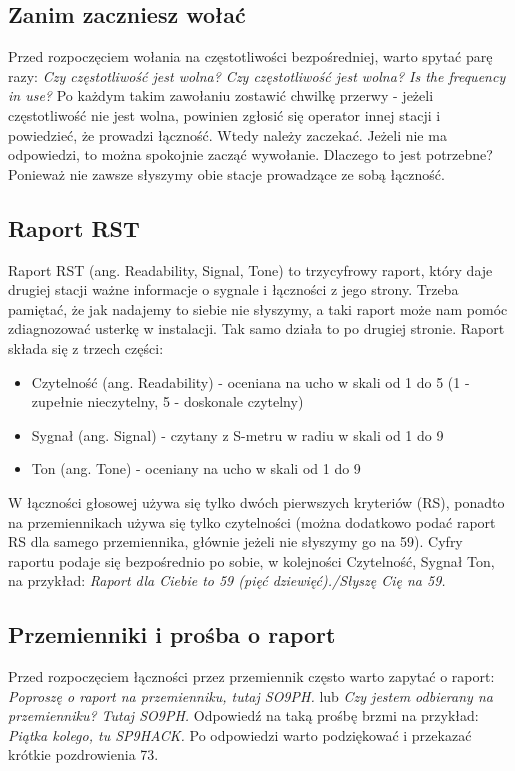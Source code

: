 \documentclass[a4paper,11pt]{article}
\begin{document}
\subsection{Zanim zaczniesz wołać}
Przed rozpoczęciem wołania na częstotliwości bezpośredniej, warto spytać parę razy: \textit{Czy częstotliwość jest wolna? Czy częstotliwość jest wolna? Is the frequency in use?} Po każdym takim zawołaniu zostawić chwilkę przerwy - jeżeli częstotliwość nie jest wolna, powinien zgłosić się operator innej stacji i powiedzieć, że prowadzi łączność. Wtedy należy zaczekać. Jeżeli nie ma odpowiedzi, to można spokojnie zacząć wywołanie. Dlaczego to jest potrzebne? Ponieważ nie zawsze słyszymy obie stacje prowadzące ze sobą łączność.
\subsection{Raport RST}
Raport RST (ang. Readability, Signal, Tone) to trzycyfrowy raport, który daje drugiej stacji ważne informacje o sygnale i łączności z jego strony. Trzeba pamiętać, że jak nadajemy to siebie nie słyszymy, a taki raport może nam pomóc zdiagnozować usterkę w instalacji. Tak samo działa to po drugiej stronie. Raport składa się z trzech części:
\begin{itemize}
\item Czytelność (ang. Readability) - oceniana na ucho w skali od 1 do 5 (1 - zupełnie nieczytelny, 5 - doskonale czytelny)
\item Sygnał (ang. Signal) - czytany z S-metru w radiu w skali od 1 do 9
\item Ton (ang. Tone) - oceniany na ucho w skali od 1 do 9
\end{itemize}
W łączności głosowej używa się tylko dwóch pierwszych kryteriów (RS), ponadto na przemiennikach używa się tylko czytelności (można dodatkowo podać raport RS dla samego przemiennika, głównie jeżeli nie słyszymy go na 59). Cyfry raportu podaje się bezpośrednio po sobie, w kolejności Czytelność, Sygnał Ton, na przykład: \textit{Raport dla Ciebie to 59 (pięć dziewięć)./Słyszę Cię na 59.}
\subsection{Przemienniki i prośba o raport}
Przed rozpoczęciem łączności przez przemiennik często warto zapytać o raport: \textit{Poproszę o raport na przemienniku, tutaj SO9PH.} lub \textit{Czy jestem odbierany na przemienniku? Tutaj SO9PH.} Odpowiedź na taką prośbę brzmi na przykład: \textit{Piątka kolego, tu SP9HACK.} Po odpowiedzi warto podziękować i przekazać krótkie pozdrowienia 73.
\end{document}
